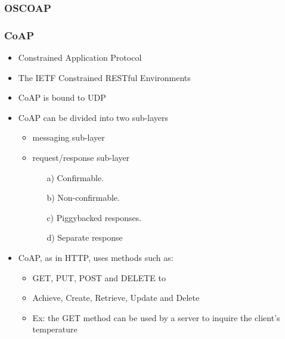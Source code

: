 \subsubsection{OSCOAP}

\subsubsection{CoAP}

\begin{itemize}
	\item Constrained Application Protocol
	\item The IETF Constrained RESTful Environments
	\item CoAP is bound to UDP
	\item CoAP can be divided into two sub-layers
		\begin{itemize}
			\item messaging sub-layer
			\item request/response sub-layer
			\begin{itemize}
				\item[a)] Confirmable. 
				\item[b)] Non-confirmable. 
				\item[c)] Piggybacked responses. 
				\item[d)] Separate response
			\end{itemize}
		\end{itemize}
	\item CoAP, as in HTTP, uses methods such as:
	\begin{itemize}
		\item GET, PUT, POST and DELETE to 
		\item Achieve, Create, Retrieve, Update and Delete
	\end{itemize}
	\begin{itemize}
		\item Ex: the GET method can be used by a server to inquire the client’s temperature
	\end{itemize}
\end{itemize}

